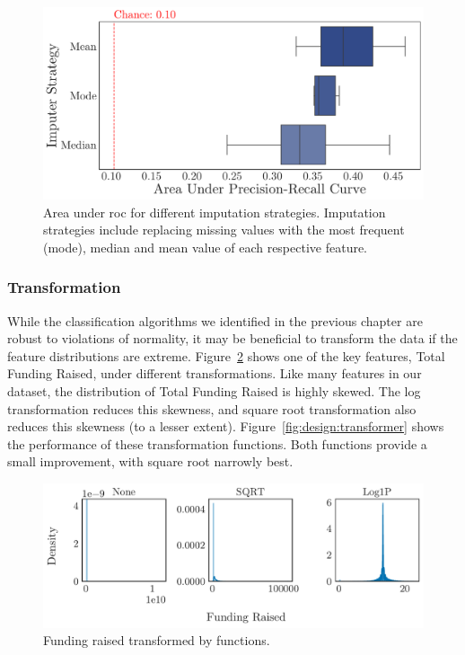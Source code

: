\documentclass[../thesis/thesis.tex]{subfiles}
\begin{document}
\begin{figure}[!htb]
    \centering
    \includegraphics[width=\textwidth]{../figures/design/auc_imputer}
    \caption[Area under \gls{pr} Curves by imputation strategy]{Area under \gls{roc} for different imputation strategies. Imputation strategies include replacing missing values with the most frequent (mode), median and mean value of each respective feature.}
    \label{fig:design:imputer}
\end{figure}

\subsubsection{Transformation}

While the classification algorithms we identified in the previous chapter are robust to violations of normality, it may be beneficial to transform the data if the feature distributions are extreme. Figure~\ref{fig:design:funding_transformation} shows one of the key features, Total Funding Raised, under different transformations. Like many features in our dataset, the distribution of Total Funding Raised is highly skewed. The log transformation reduces this skewness, and square root transformation also reduces this skewness (to a lesser extent). Figure~\ref{fig:design:transformer} shows the performance of these transformation functions. Both functions provide a small improvement, with square root narrowly best.

\begin{figure}[!htb]
    \centering
    \includegraphics[width=\textwidth]{../figures/design/distribution_funding_transformed}
    \caption[Funding raised transformed by functions]{Funding raised transformed by functions.}
    \label{fig:design:funding_transformation}
\end{figure}
\end{document}
